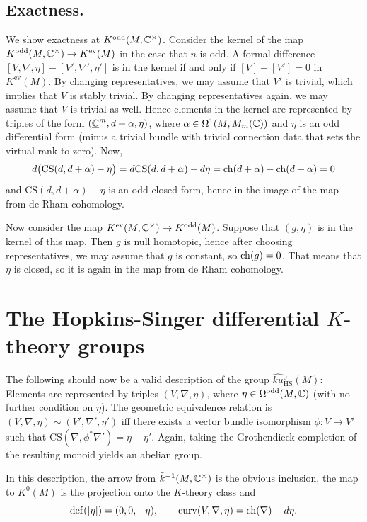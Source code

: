 \documentclass[10pt]{amsart}
\begin{document}
\subsection{Exactness.}
We show exactness at $K^{\mathrm{odd}}(M, \mathbb{C}^\times)$. Consider the kernel of the map $K^{\mathrm{odd}}(M, \mathbb{C}^\times) \to K^{\mathrm{ev}}(M)$ in the case that $n$ is odd. A formal difference $[V, \nabla, \eta] - [V', \nabla', \eta']$ is in the kernel if and only if $[V] - [V'] = 0$ in $K^{\mathrm{ev}}(M)$. By changing representatives, we may assume that $V'$ is trivial, which implies that $V$ is stably trivial. By changing representatives again, we may assume that $V$ is trivial as well. Hence elements in the kernel are represented by triples of the form $(\underline{\mathbb{C}}^m, d+\alpha, \eta)$, where $\alpha \in \Omega^1(M, M_m(\mathbb{C}))$ and $\eta$ is an odd differential form (minus a trivial bundle with trivial connection data that sets the virtual rank to zero). Now, 
\[
d\bigl(\mathrm{CS}(d, d+\alpha) - \eta\bigr) =  d\mathrm{CS}(d, d+\alpha) - d\eta = \mathrm{ch}(d+\alpha) - \mathrm{ch}(d+\alpha) = 0
\]
and $\mathrm{CS}(d, d+\alpha) - \eta$ is an odd closed form, hence in the image of the map from de Rham cohomology.

Now consider the map $K^{\mathrm{ev}}(M, \mathbb{C}^\times) \to K^{\mathrm{odd}}(M)$.
Suppose that $(g, \eta)$ is in the kernel of this map. Then $g$ is null homotopic, hence after choosing representatives, we may assume that $g$ is constant, so $\mathrm{ch}(g) = 0$. That means that $\eta$ is closed, so it is again in the map from de Rham cohomology.

\section{The Hopkins-Singer differential \texorpdfstring{$K$}{K}-theory groups}

The following should now be a valid description of the group $\widehat{ku}{}^0_{\mathrm{HS}}(M)$: Elements are represented by triples $(V, \nabla, \eta)$, where $\eta \in \Omega^{\mathrm{odd}}(M, \mathbb{C})$ (with no further condition on $\eta$). The geometric equivalence relation is $(V, \nabla, \eta) \sim (V', \nabla', \eta')$ iff there exists a vector bundle isomorphism $\phi : V \to V'$ such that $ \mathrm{CS}(\nabla, \phi^*\nabla') = \eta - \eta'$. Again, taking the Grothendieck completion of the resulting monoid yields an abelian group.

In this description, the arrow from $\tilde{k}^{-1}(M, \mathbb{C}^\times)$ is the obvious inclusion, the map to $K^0(M)$ is the projection onto the $K$-theory class and
\[
\mathrm{def}([\eta]) = (0, 0, -\eta), \qquad \mathrm{curv}(V, \nabla, \eta) = \mathrm{ch}(\nabla) - d\eta.
\]
\end{document}
